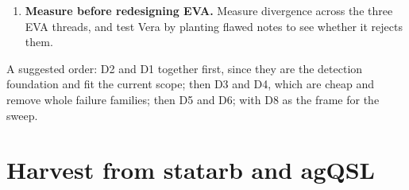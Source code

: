 \documentclass[11pt,a4paper]{article}
\begin{document}
\begin{enumerate}[label=\textbf{D\arabic*}]
  A first template, extracted from a typical recap the operator received on
  29 September (SA, 13:11 Paris), with gaps in that recap added:
  \begin{enumerate}[label=\arabic*.,nosep]
  \item \emph{Status} with timestamp: running or stopped, since when, and why,
    in one sentence; whether any agent is running.
  \item \emph{Totals} as fixed counters from the campaign state, with the change
    since the previous iteration (the example gave totals but no delta).
  \item \emph{Blockers}, grouped by failure class with counts, so that nine
    instances of one cause read as one blocker.
  \item \emph{Corrections}: what the previous iteration got wrong.
  \item \emph{New results} since the previous iteration.
  \item \emph{Still active}: live items with their health measures.
  \item \emph{Fixes applied} in this iteration (missing from the example).
  \item \emph{Fixes to apply next}: repairs to code, contracts or artefacts
    that are diagnosed but not yet done, each tied to the blocker it removes.
  \item \emph{Next steps}: campaign actions (resume, relaunch, pause), ordered,
    each with a precondition to check before acting; a restart requires a
    diagnosed blocker and its fix applied.
  \item \emph{Decisions needed from the operator} (missing from the example).
  \end{enumerate}
\item \textbf{Measure before redesigning EVA.} Measure divergence across the three
  EVA threads, and test Vera by planting flawed notes to see whether it rejects
  them.
\end{enumerate}

A suggested order: D2 and D1 together first, since they are the detection
foundation and fit the current scope; then D3 and D4, which are cheap and remove
whole failure families; then D5 and D6; with D8 as the frame for the sweep.

\section{Harvest from statarb and agQSL}\label{sec:harvest}
\end{document}
